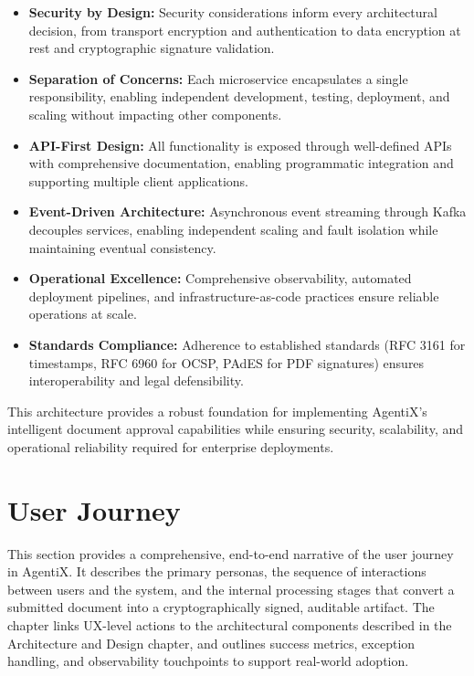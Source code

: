 \documentclass[12pt,oneside,openright,a4paper]{cpe-english-project}
\begin{document}
\begin{itemize}
\item \textbf{Security by Design:} Security considerations inform every architectural decision, from transport encryption and authentication to data encryption at rest and cryptographic signature validation.

\item \textbf{Separation of Concerns:} Each microservice encapsulates a single responsibility, enabling independent development, testing, deployment, and scaling without impacting other components.

\item \textbf{API-First Design:} All functionality is exposed through well-defined APIs with comprehensive documentation, enabling programmatic integration and supporting multiple client applications.

\item \textbf{Event-Driven Architecture:} Asynchronous event streaming through Kafka decouples services, enabling independent scaling and fault isolation while maintaining eventual consistency.

\item \textbf{Operational Excellence:} Comprehensive observability, automated deployment pipelines, and infrastructure-as-code practices ensure reliable operations at scale.\sloppy

\item \textbf{Standards Compliance:} Adherence to established standards (RFC 3161 for timestamps, RFC 6960 for OCSP, PAdES for PDF signatures) ensures interoperability and legal defensibility.
\end{itemize}

\vspace{1em}

This architecture provides a robust foundation for implementing AgentiX's intelligent document approval capabilities while ensuring security, scalability, and operational reliability required for enterprise deployments.

\section{User Journey}

This section provides a comprehensive, end-to-end narrative of the user
journey in AgentiX. It describes the primary personas, the sequence of
interactions between users and the system, and the internal processing
stages that convert a submitted document into a cryptographically
signed, auditable artifact. The chapter links UX-level actions to the
architectural components described in the Architecture and Design
chapter, and outlines success metrics, exception handling, and
observability touchpoints to support real-world adoption.
\end{document}
